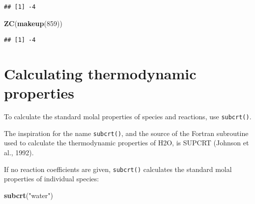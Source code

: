 \documentclass[]{tufte-handout}
\newenvironment{Shaded}{}{}
\newcommand{\KeywordTok}[1]{\textcolor[rgb]{0.00,0.44,0.13}{\textbf{#1}}}
\newcommand{\DecValTok}[1]{\textcolor[rgb]{0.25,0.63,0.44}{#1}}
\newcommand{\StringTok}[1]{\textcolor[rgb]{0.25,0.44,0.63}{#1}}
\newcommand{\NormalTok}[1]{#1}
\begin{document}
\begin{verbatim}
## [1] -4
\end{verbatim}

\begin{Shaded}
\begin{Highlighting}[]
\KeywordTok{ZC}\NormalTok{(}\KeywordTok{makeup}\NormalTok{(}\DecValTok{859}\NormalTok{))}
\end{Highlighting}
\end{Shaded}

\begin{verbatim}
## [1] -4
\end{verbatim}

\section{Calculating thermodynamic
properties}\label{calculating-thermodynamic-properties}

To calculate the standard molal properties of species and reactions, use
{\texttt{subcrt()}}.

\begin{marginfigure}
The inspiration for the name {\texttt{subcrt()}}, and the source of the
Fortran subroutine used to calculate the thermodynamic properties of
H2O, is SUPCRT (Johnson et al., 1992).
\end{marginfigure}

\citeyearpar{JOH92} If no reaction coefficients are given,
{\texttt{subcrt()}} calculates the standard molal properties of
individual species:

\begin{Shaded}
\begin{Highlighting}[]
\KeywordTok{subcrt}\NormalTok{(}\StringTok{"water"}\NormalTok{)}
\end{Highlighting}
\end{Shaded}
\end{document}
